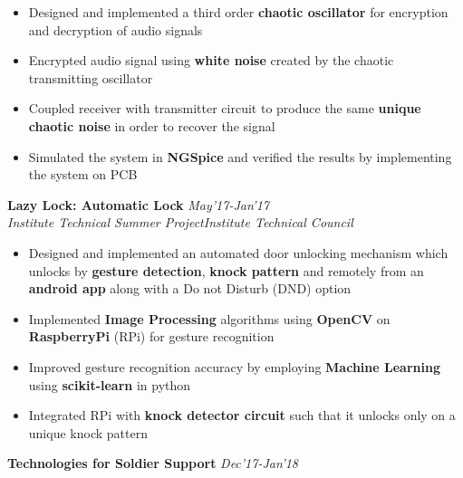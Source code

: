 \documentclass{article}
\begin{document}
{\begin{itemize}[label=\textcolor{myblue}{\textbullet},itemsep = -0.75 mm, leftmargin=5.5mm]\vspace{-2.5pt}
\item Designed and implemented a third order \textbf{chaotic oscillator} for encryption and decryption of audio signals
	\item Encrypted audio signal using \textbf{white noise} created by the chaotic transmitting oscillator
	\item Coupled receiver with transmitter circuit to produce the same \textbf{unique chaotic noise} in order to recover the signal
	\item Simulated the system in \textbf{NGSpice} and verified the results by implementing the system on PCB
\end{itemize}
\vspace{-2.5pt}
\textbf{\large Lazy Lock: Automatic Lock} \hfill{\em May'17-Jan'17}\\
{\it Institute Technical Summer Project}\hfill{\it Institute Technical Council}\\\vspace{-15pt}
\begin{itemize}[label=\textcolor{myblue}{\textbullet},itemsep = -0.75 mm, leftmargin=5.5mm]
\vspace{-2.5pt}
\item Designed and implemented an automated door unlocking mechanism which unlocks by \textbf{gesture detection}, \textbf{knock pattern} and remotely from an \textbf{android app} along with a Do not Disturb (DND) option
	\item Implemented \textbf{Image Processing} algorithms using \textbf{OpenCV} on \textbf{RaspberryPi} (RPi) for gesture recognition
	\item Improved gesture recognition accuracy by employing \textbf{Machine Learning} using \textbf{scikit-learn} in python
    \item Integrated RPi with \textbf{knock detector circuit} such that it unlocks only on a unique knock pattern
\end{itemize}
\vspace{-2.5pt}
\textbf{\large Technologies for Soldier Support} \hfill{\em Dec'17-Jan'18}\\
}
\end{document}
